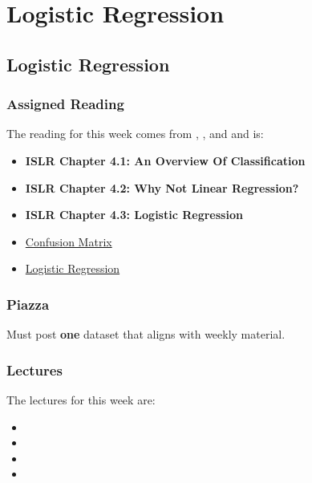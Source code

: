 \clearpage

\renewcommand{\ChapTitle}{Logistic Regression}
\renewcommand{\SectionTitle}{Logistic Regression}

\chapter{\ChapTitle}
\section{\SectionTitle}

\subsection{Assigned Reading}

The reading for this week comes from \ISLRPython, \ISLRR, and \ESLII \hspace*{1pt} and is:

\begin{itemize}
    \item \textbf{ISLR Chapter 4.1: An Overview Of Classification}
    \item \textbf{ISLR Chapter 4.2: Why Not Linear Regression?}
    \item \textbf{ISLR Chapter 4.3: Logistic Regression}
    \item \href{https://en.wikipedia.org/wiki/Confusion_matrix}{Confusion Matrix}
    \item \href{https://scikit-learn.org/stable/modules/generated/sklearn.linear_model.LogisticRegression.html}{Logistic Regression}
\end{itemize}

\subsection{Piazza}

Must post \textbf{one} dataset that aligns with weekly material.

\subsection{Lectures}

The lectures for this week are:

\begin{itemize}
    \item {}
    \item {}
    \item {}
    \item {}
\end{itemize}

